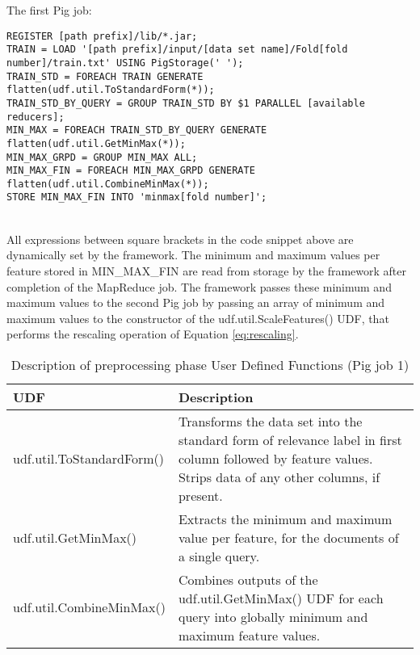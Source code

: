 The first Pig job:\\
\begin{minipage}{\linewidth}
\begin{lstlisting}
REGISTER [path prefix]/lib/*.jar;
TRAIN = LOAD '[path prefix]/input/[data set name]/Fold[fold number]/train.txt' USING PigStorage(' ');
TRAIN_STD = FOREACH TRAIN GENERATE flatten(udf.util.ToStandardForm(*));
TRAIN_STD_BY_QUERY = GROUP TRAIN_STD BY $1 PARALLEL [available reducers];
MIN_MAX = FOREACH TRAIN_STD_BY_QUERY GENERATE flatten(udf.util.GetMinMax(*));
MIN_MAX_GRPD = GROUP MIN_MAX ALL;
MIN_MAX_FIN = FOREACH MIN_MAX_GRPD GENERATE flatten(udf.util.CombineMinMax(*));
STORE MIN_MAX_FIN INTO 'minmax[fold number]';
\end{lstlisting}
\end{minipage}\\

All expressions between square brackets in the code snippet above are dynamically set by the framework. The minimum and maximum values per feature stored in MIN\_MAX\_FIN are read from storage by the framework after completion of the MapReduce job. The framework passes these minimum and maximum values to the second Pig job by passing an array of minimum and maximum values to the constructor of the udf.util.ScaleFeatures() \ac{UDF}, that performs the rescaling operation of Equation \ref{eq:rescaling}.\\

\begin{table}
\centering
\begin{tabular}{p{6cm}p{7cm}}\toprule
UDF & Description \\
\midrule
udf.util.ToStandardForm() & Transforms the data set into the standard form of relevance label in first column followed by feature values. Strips data of any other columns, if present.\\
udf.util.GetMinMax() & Extracts the minimum and maximum value per feature, for the documents of a single query.\\
udf.util.CombineMinMax() & Combines outputs of the udf.util.GetMinMax() UDF for each query into globally minimum and maximum feature values.\\
\bottomrule
\end{tabular}
\caption{Description of preprocessing phase User Defined Functions (Pig job 1)}
\label{tbl:preprocessing_udfs_1}
\end{table}

